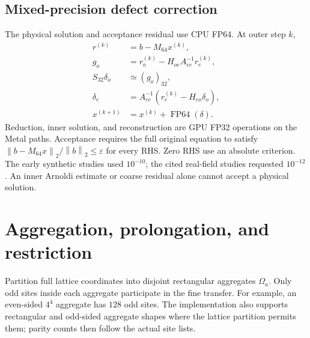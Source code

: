 \documentclass[11pt]{article}
\newcommand{\norm}[1]{\left\lVert#1\right\rVert_2}
\begin{document}
\subsection{Mixed-precision defect correction}
The physical solution and acceptance residual use CPU FP64. At outer step $k$,
\begin{align}
 r^{(k)}&=b-M_{64}x^{(k)},\\
 g_o&=r_o^{(k)}-H_{oe}A_{ee}^{-1}r_e^{(k)},\\
 S_{32}\delta_o&\simeq (g_o)_{32},\\
 \delta_e&=A_{ee}^{-1}(r_e^{(k)}-H_{eo}\delta_o),\\
 x^{(k+1)}&=x^{(k)}+\operatorname{FP64}(\delta).
\end{align}
Reduction, inner solution, and reconstruction are GPU FP32 operations on the
Metal paths. Acceptance requires the full original equation to satisfy
$\norm{b-M_{64}x}/\norm b\leq\varepsilon$ for every RHS. Zero RHS use an
absolute criterion. The early synthetic studies used $10^{-10}$; the cited
real-field studies requested $10^{-12}$. An inner Arnoldi estimate or coarse
residual alone cannot accept a physical solution.

\section{Aggregation, prolongation, and restriction}
Partition full lattice coordinates into disjoint rectangular aggregates
$\Omega_a$. Only odd sites inside each aggregate participate in the fine
transfer. For example, an even-sided $4^4$ aggregate has $128$ odd sites.
The implementation also supports rectangular and odd-sided aggregate shapes
where the lattice partition permits them; parity counts then follow the actual
site lists.
\end{document}
